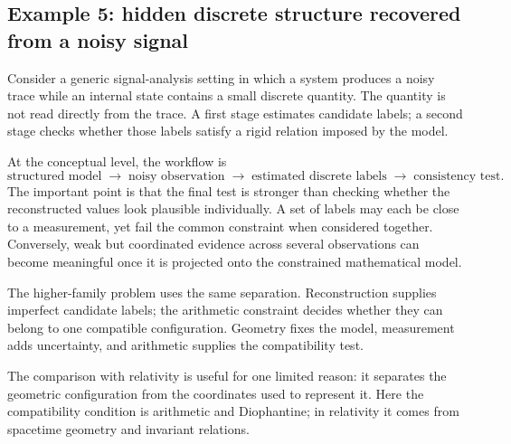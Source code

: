 \documentclass[11pt,a4paper]{article}
\begin{document}
\subsection{Example 5: hidden discrete structure recovered from a noisy signal}
Consider a generic signal-analysis setting in which a system produces a noisy trace while an internal state contains a small discrete quantity. The quantity is not read directly from the trace. A first stage estimates candidate labels; a second stage checks whether those labels satisfy a rigid relation imposed by the model.

At the conceptual level, the workflow is
\[
\text{structured model}
\;\longrightarrow\;
\text{noisy observation}
\;\longrightarrow\;
\text{estimated discrete labels}
\;\longrightarrow\;
\text{consistency test}.
\]
The important point is that the final test is stronger than checking whether the reconstructed values look
plausible individually. A set of labels may each be close to a measurement, yet fail the common constraint
when considered together. Conversely, weak but coordinated evidence across several observations can become
meaningful once it is projected onto the constrained mathematical model.

The higher-family problem uses the same separation. Reconstruction supplies imperfect candidate labels; the arithmetic constraint decides whether they can belong to one compatible configuration. Geometry fixes the model, measurement adds uncertainty, and arithmetic supplies the compatibility test.

The comparison with relativity is useful for one limited reason: it separates the geometric configuration from the coordinates used to represent it. Here the compatibility condition is arithmetic and Diophantine; in relativity it comes from spacetime geometry and invariant relations.
\end{document}
